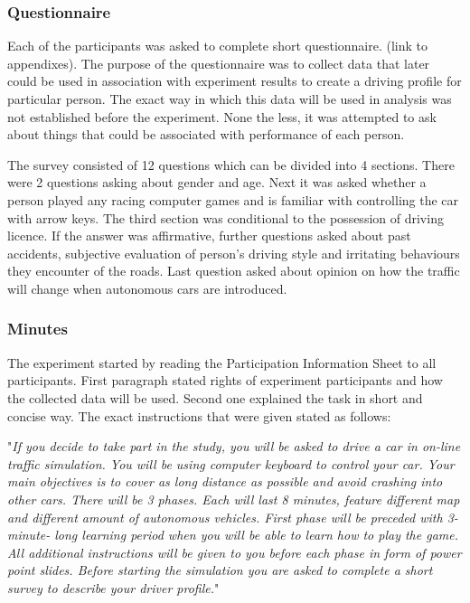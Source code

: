 \documentclass[11pt,english]{article}
\begin{document}
\subsubsection{Questionnaire}

Each of the participants was asked to complete short questionnaire. (link to appendixes). The purpose of the questionnaire was to collect data that later could be used in association with experiment results to create a driving profile for particular person. The exact way in which this data will be used in analysis was not established before the experiment. None the less, it was attempted to ask about things that could be associated with performance of each person.

The survey consisted of 12 questions which can be divided into 4 sections. There were 2 questions asking about gender and age. Next it was asked whether a person played any racing computer games and is familiar with controlling the car with arrow keys. The third section was conditional to the possession of driving licence. If the answer was affirmative, further questions asked about past accidents, subjective evaluation of person's driving style and irritating behaviours they encounter of the roads.
Last question asked about opinion on how the traffic will change when autonomous cars are introduced. 




\subsubsection{Minutes}

The experiment started by reading the Participation Information Sheet to all participants. First paragraph stated rights of experiment participants and how the collected data will be used. Second one explained the task in short and concise way. The exact instructions that were given stated as follows:

"\textit{If you decide to take part in the study, you will be asked to drive a car in on-line traffic simulation. You will be using computer keyboard to control your car. Your main objectives is to cover as long distance as possible and avoid crashing into other cars. There will be 3 phases. Each will last 8 minutes, feature different map and different amount of autonomous vehicles. First phase will be preceded with 3-minute- long learning period when you will be able to learn how to play the game. All additional instructions will be given to you before each phase in form of power point slides. Before starting the simulation you are asked to complete a short survey to describe your driver profile.}"
\end{document}
